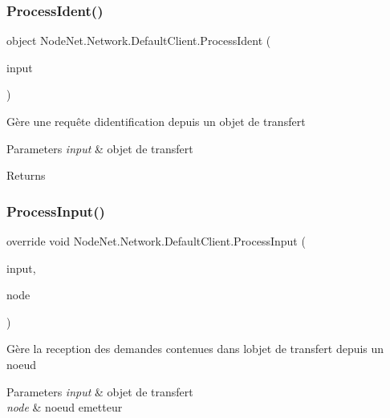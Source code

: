\subsubsection{\texorpdfstring{Process\+Ident()}{ProcessIdent()}}
{\footnotesize\ttfamily object Node\+Net.\+Network.\+Default\+Client.\+Process\+Ident (\begin{DoxyParamCaption}\item[{\hyperlink{class_node_net_1_1_data_1_1_data_input}{Data\+Input}}]{input }\end{DoxyParamCaption})}



Gère une requête d\textquotesingle{}identification depuis un objet de transfert 


\begin{DoxyParams}{Parameters}
{\em input} & objet de transfert\\
\hline
\end{DoxyParams}
\begin{DoxyReturn}{Returns}

\end{DoxyReturn}
\mbox{\label{class_node_net_1_1_network_1_1_default_client_a2f6688da612c04b54a102a21401e4d5b}} 
\subsubsection{\texorpdfstring{Process\+Input()}{ProcessInput()}}
{\footnotesize\ttfamily override void Node\+Net.\+Network.\+Default\+Client.\+Process\+Input (\begin{DoxyParamCaption}\item[{\hyperlink{class_node_net_1_1_data_1_1_data_input}{Data\+Input}}]{input,  }\item[{\hyperlink{class_node_net_1_1_network_1_1_nodes_1_1_node}{Node}}]{node }\end{DoxyParamCaption})\hspace{0.3cm}{\ttfamily [virtual]}}



Gère la reception des demandes contenues dans l\textquotesingle{}objet de transfert depuis un noeud 


\begin{DoxyParams}{Parameters}
{\em input} & objet de transfert\\
\hline
{\em node} & noeud emetteur\\
\hline
\end{DoxyParams}


